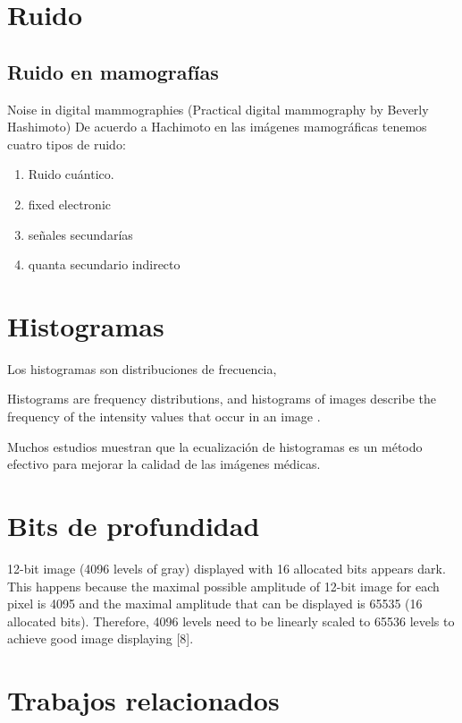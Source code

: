 \section{Ruido}

\subsection{Ruido en mamografías}

\cite{hashimoto2008practical}
Noise in digital mammographies (Practical digital mammography by Beverly
Hashimoto) De acuerdo a Hachimoto en las imágenes mamográficas tenemos cuatro
tipos de ruido:

\begin{enumerate}
    \item Ruido cuántico.
    \item fixed electronic
    \item señales secundarías
    \item quanta secundario indirecto
\end{enumerate}

\section{Histogramas}
Los histogramas son distribuciones de frecuencia, 

Histograms are frequency distributions, and histograms of images describe the
frequency of the intensity values that occur in an image \cite{burger2008digital}.


Muchos estudios muestran que la ecualización de histogramas es un método
efectivo para mejorar la calidad de las imágenes médicas.

\section{Bits de profundidad}

12-bit image (4096 levels of gray) displayed with 16 allocated bits appears
dark. This happens because the maximal possible amplitude of 12-bit image for
each pixel is 4095 and the maximal amplitude that can be displayed is 65535 (16
allocated bits). Therefore, 4096 levels need to be linearly scaled to 65536
levels to achieve good image displaying [8].

\section{Trabajos relacionados}

